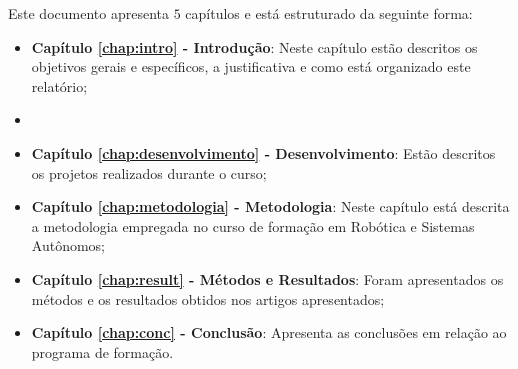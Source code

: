 Este documento apresenta $5$ capítulos e está estruturado da seguinte forma:

\begin{itemize}

  \item \textbf{Capítulo \ref{chap:intro} - Introdução}: Neste capítulo estão descritos os objetivos gerais e específicos, a justificativa e como está organizado este relatório;
  \item  \item \textbf{Capítulo \ref{chap:desenvolvimento} - Desenvolvimento}: Estão descritos os projetos realizados durante o curso;
  \item \textbf{Capítulo \ref{chap:metodologia} - Metodologia}: Neste capítulo está descrita a metodologia empregada no curso de formação em Robótica e Sistemas Autônomos; 
  \item \textbf{Capítulo \ref{chap:result} - Métodos e Resultados}: Foram apresentados os métodos e os resultados obtidos nos artigos apresentados;
  \item \textbf{Capítulo \ref{chap:conc} - Conclusão}: Apresenta as conclusões em relação ao programa de formação.

\end{itemize}